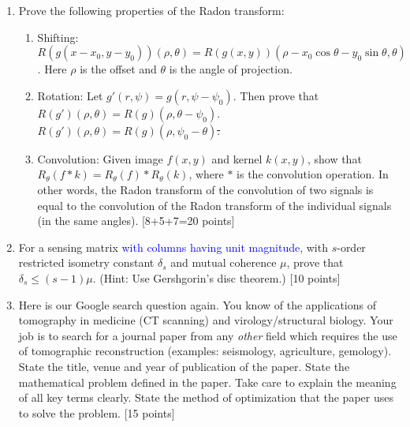 \documentclass[11pt]{article}
\begin{document}
\begin{enumerate}
\item Prove the following properties of the Radon transform:
\begin{enumerate}
\item Shifting: $R(g(x-x_0,y-y_0))(\rho,\theta) = R(g(x,y))(\rho-x_0 \cos \theta - y_0 \sin \theta,\theta)$. Here $\rho$ is the offset and $\theta$ is the angle of projection.
\item Rotation: Let $g'(r,\psi) = g(r,\psi-\psi_0)$. Then prove that $R(g')(\rho,\theta) = R(g)(\rho,\theta-\psi_0)$. \sout{$R(g')(\rho,\theta) = R(g)(\rho,\psi_0-\theta)$.}
\item Convolution: Given image $f(x,y)$ and kernel $k(x,y)$, show that $R_{\theta}(f*k) = R_{\theta}(f) * R_{\theta}(k)$, where $*$ is the convolution operation. In other words, the Radon transform of the convolution of two signals is equal to the convolution of the Radon transform of the individual signals (in the same angles). \textsf{[8+5+7=20 points]}
\end{enumerate}

\item For a sensing matrix \textcolor{blue}{with columns having unit magnitude}, with $s$-order restricted isometry constant $\delta_s$ and mutual coherence $\mu$, prove that $\delta_s \leq (s-1) \mu$. (Hint: Use Gershgorin's disc theorem.) \textsf{[10 points]}

\item Here is our Google search question again. You know of the applications of tomography in medicine (CT scanning) and virology/structural biology. Your job is to search for a journal paper from any \emph{other} field which requires the use of tomographic reconstruction (examples: seismology, agriculture, gemology). State the title, venue and year of publication of the paper. State the mathematical problem defined in the paper. Take care to explain the meaning of all key terms clearly. State the method of optimization that the paper uses to solve the problem. \textsf{[15 points]}

\end{enumerate}
\end{document}
